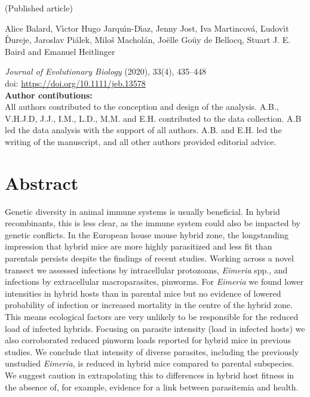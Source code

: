 (Published article) \par

Alice Balard, V{\'{\i}}ctor Hugo Jarqu{\'{\i}}n-D{\'{\i}}az, Jenny Jost, Iva Martincov{\'{a}}, {\v{L}}udov{\'{\i}}t {\v{D}}ureje, Jaroslav Pi{\'{a}}lek, Milo{\v{s}} Machol{\'{a}}n, Joëlle Go\"{u}y de Bellocq, Stuart J. E. Baird and Emanuel Heitlinger \par
  
\textit{Journal of Evolutionary Biology} (2020), 33(4), 435–448 \\
doi: \url{https://doi.org/10.1111/jeb.13578}\\

\textbf{Author contibutions:}\\
All authors contributed to the conception and design of the analysis. A.B., V.H.J.D, J.J., I.M., L.D., M.M. and E.H. contributed to the data collection. A.B led the data analysis with the support of all authors. A.B. and E.H. led the writing of the manuscript, and all other authors provided editorial advice. \par

\newpage

\section{Abstract}
Genetic diversity in animal immune systems is usually beneficial. In hybrid recombinants, this is less clear, as the immune system could also be impacted by genetic conflicts. In the European house mouse hybrid zone, the longstanding impression that hybrid mice are more highly parasitized and less fit than parentals persists despite the findings of recent studies. Working across a novel transect we assessed infections by intracellular protozoans, \textit{Eimeria} spp., and infections by extracellular macroparasites, pinworms. For \textit{Eimeria} we found lower intensities in hybrid hosts than in parental mice but no evidence of lowered probability of infection or increased mortality in the centre of the hybrid zone. This means ecological factors are very unlikely to be responsible for the reduced load of infected hybrids. Focusing on parasite intensity (load in infected hosts) we also corroborated reduced pinworm loads reported for hybrid mice in previous studies. We conclude that intensity of diverse parasites, including the previously unstudied \textit{Eimeria}, is reduced in hybrid mice compared to parental subspecies. We suggest caution in extrapolating this to differences in hybrid host fitness in the absence of, for example, evidence for a link between parasitemia and health.

